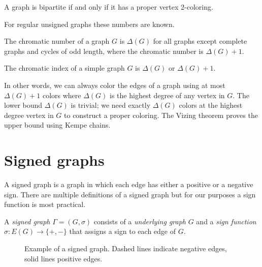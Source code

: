 \begin{theorem}\label{th:bipartite}
    A graph is bipartite if and only if it has a proper vertex 2-coloring.
\end{theorem}

For regular unsigned graphs these numbers are known.

\begin{theorem}[Brooks]
    The chromatic number of a graph $G$ is $\Delta(G)$ for all graphs except complete graphs and cycles of odd length, where the chromatic number is $\Delta(G) + 1$.\cite{brooks}
\end{theorem}

\begin{theorem}[Vizing]
    The chromatic index of a simple graph $G$ is $\Delta(G)$ or $\Delta(G) + 1$.
\end{theorem}

In other words, we can always color the edges of a graph using at most $\Delta(G) + 1$ colors where $\Delta(G)$ is the highest degree of any vertex in $G$. The lower bound $\Delta(G)$ is trivial; we need exactly $\Delta(G)$ colors at the highest degree vertex in $G$ to construct a proper coloring. The Vizing theorem proves the upper bound using Kempe chains.

\section{Signed graphs}

A signed graph is a graph in which each edge has either a positive or a negative sign. There are multiple definitions of a signed graph but for our purposes a sign function is most practical.

\begin{definition}
    A \textit{signed graph} $\Gamma = (G, \sigma)$ consists of a \textit{underlying graph} $G$ and a \textit{sign function} $\sigma : E(G) \rightarrow \{+,-\}$ that assigns a sign to each edge of $G$.
\end{definition}

\begin{figure}[h]
    \centering
    \caption[Example of a signed graph]{Example of a signed graph. Dashed lines indicate negative edges, solid lines positive edges.}
\end{figure}

